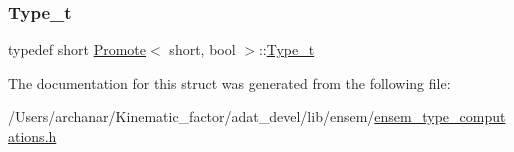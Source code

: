 \subsubsection{\texorpdfstring{Type\_t}{Type\_t}\hspace{0.1cm}{\footnotesize\ttfamily [2/2]}}
{\footnotesize\ttfamily typedef short \mbox{\hyperlink{structPromote}{Promote}}$<$ short, bool $>$\+::\mbox{\hyperlink{structPromote_3_01short_00_01bool_01_4_a4f4ef8db654939c693bf155cff1e36a3}{Type\+\_\+t}}}



The documentation for this struct was generated from the following file\+:\begin{DoxyCompactItemize}
\item 
/\+Users/archanar/\+Kinematic\+\_\+factor/adat\+\_\+devel/lib/ensem/\mbox{\hyperlink{lib_2ensem_2ensem__type__computations_8h}{ensem\+\_\+type\+\_\+computations.\+h}}\end{DoxyCompactItemize}
